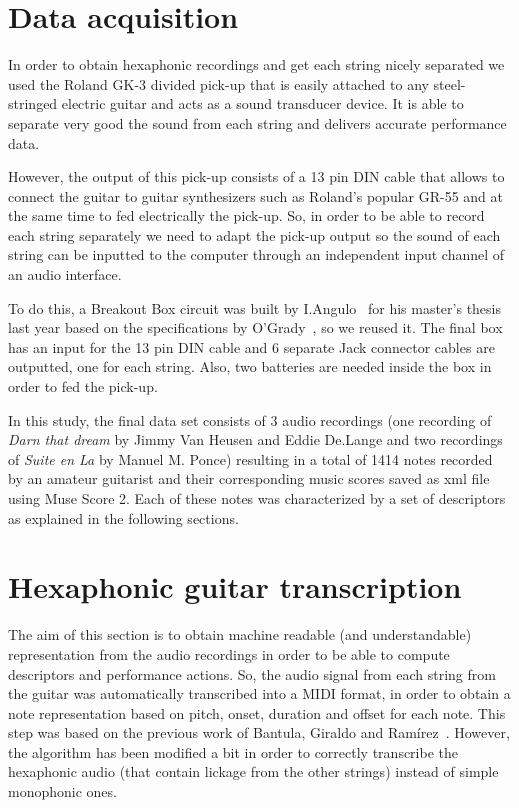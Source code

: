 \section{Data acquisition}
In order to obtain hexaphonic recordings and get each string nicely separated we used the Roland GK-3 divided pick-up that is easily attached to any steel-stringed electric guitar and acts as a sound transducer device. It is able to separate very good the sound from each string and delivers accurate performance data.

However, the output of this pick-up consists of a 13 pin DIN cable that allows to connect the guitar to guitar synthesizers such as Roland's popular GR-55 and at the same time to fed electrically the pick-up. So, in order to be able to record each string separately we need to adapt the pick-up output so the sound of each string can be inputted to the computer through an independent input channel of an audio interface.

To do this, a Breakout Box circuit was built by I.Angulo~\cite{Angulo2016} for his master's thesis last year based on the specifications by O'Grady~\cite{OGrady2009}, so we reused it. The final box has an input for the 13 pin DIN cable and 6 separate Jack connector cables are outputted, one for each string. Also, two batteries are needed inside the box in order to fed the pick-up. 

In this study, the final data set consists of 3 audio recordings (one recording of \textit{Darn that dream} by Jimmy Van Heusen and Eddie De.Lange and two recordings of \textit{Suite en La} by Manuel M. Ponce) resulting in a total of 1414 notes recorded by an amateur guitarist and their corresponding music scores saved as xml file using Muse Score 2. Each of these notes was characterized by a set of descriptors as explained in the following sections.  

\section{Hexaphonic guitar transcription}
The aim of this section is to obtain machine readable (and understandable) representation from the audio recordings in order to be able to compute descriptors and performance actions. So, the audio signal from each string from the guitar was automatically transcribed into a MIDI format, in order to obtain a note representation based on pitch, onset, duration and offset for each note. This step was based on the previous work of Bantula, Giraldo and Ramírez~\cite{bantula2016}. However, the algorithm has been modified a bit in order to correctly transcribe the hexaphonic audio (that contain lickage from the other strings) instead of simple monophonic ones.

